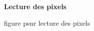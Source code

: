 \documentclass{beamer}
\begin{document}
\begin{frame}[t]
\begin{columns}[t]
\begin{column}{.5\linewidth}
\begin{block}{\centering \textbf{Lecture des pixels}}
                    \begin{center}
                        figure psnr lecture des pixels
                    \end{center}
                \end{block}
            \end{column}
        \end{columns}
    \end{frame}
\end{document}
